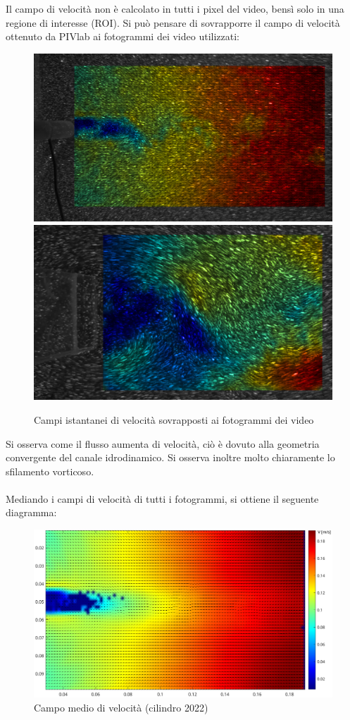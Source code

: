 \noindent Il campo di velocità non è calcolato in tutti i pixel del video, bensì solo in una regione di interesse (ROI). Si può pensare di sovrapporre il campo di velocità ottenuto da PIVlab ai fotogrammi dei video utilizzati:
\begin{figure}[H]
    \centering
    \includegraphics[width=\textwidth]{images/11/overlapped.png}
    \includegraphics[width=\textwidth]{images/11/overlap_220.png}
    \caption{Campi istantanei di velocità sovrapposti ai fotogrammi dei video}
\end{figure}

\noindent Si osserva come il flusso aumenta di velocità, ciò è dovuto alla geometria convergente del canale idrodinamico. Si osserva inoltre molto chiaramente lo sfilamento vorticoso.\\\\
Mediando i campi di velocità di tutti i fotogrammi, si ottiene il seguente diagramma:
\begin{figure}[H]
    \centering
    \includegraphics[width=.92\textwidth]{images/11/mean.png}
    \caption{Campo medio di velocità (cilindro 2022)}
\end{figure}

